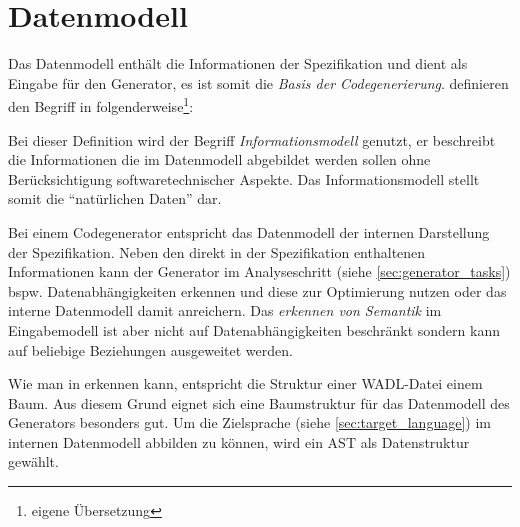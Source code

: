 \section{Datenmodell}
\label{sec:datamodel}

Das Datenmodell enthält die Informationen der Spezifikation und dient als Eingabe für den Generator, es ist somit die \emph{Basis der Codegenerierung}. \citeauthor{rfc3198} definieren den Begriff in \cite{rfc3198} folgenderweise\footnote{eigene Übersetzung}:


Bei dieser Definition wird der Begriff \emph{Informationsmodell} genutzt, er beschreibt die Informationen die im Datenmodell abgebildet werden sollen ohne Berücksichtigung softwaretechnischer Aspekte. Das Informationsmodell stellt somit die \enquote{natürlichen Daten} dar.

Bei einem Codegenerator entspricht das Datenmodell der internen Darstellung der Spezifikation. Neben den direkt in der Spezifikation enthaltenen Informationen kann der Generator im Analyseschritt (siehe \cref{sec:generator_tasks}) bspw. Datenabhängigkeiten erkennen und diese zur Optimierung nutzen oder das interne Datenmodell damit anreichern. Das \emph{erkennen von Semantik} im Eingabemodell ist aber nicht auf Datenabhängigkeiten beschränkt sondern kann auf beliebige Beziehungen ausgeweitet werden. 

Wie man in  erkennen kann, entspricht die Struktur einer WADL-Datei einem Baum. Aus diesem Grund eignet sich eine Baumstruktur für das Datenmodell des Generators besonders gut. Um die Zielsprache (siehe \cref{sec:target_language}) im internen Datenmodell abbilden zu können, wird ein \gls{AST} als Datenstruktur gewählt.

